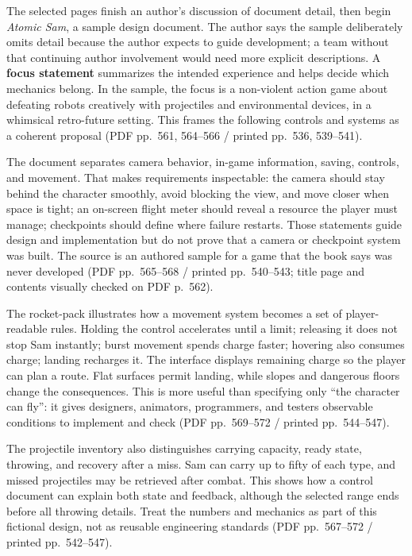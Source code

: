 The selected pages finish an author's discussion of document detail, then begin \emph{Atomic Sam}, a sample design document. The author says the sample deliberately omits detail because the author expects to guide development; a team without that continuing author involvement would need more explicit descriptions. A \textbf{focus statement} summarizes the intended experience and helps decide which mechanics belong. In the sample, the focus is a non-violent action game about defeating robots creatively with projectiles and environmental devices, in a whimsical retro-future setting. This frames the following controls and systems as a coherent proposal (PDF pp.~561, 564--566 / printed pp.~536, 539--541).

The document separates camera behavior, in-game information, saving, controls, and movement. That makes requirements inspectable: the camera should stay behind the character smoothly, avoid blocking the view, and move closer when space is tight; an on-screen flight meter should reveal a resource the player must manage; checkpoints should define where failure restarts. Those statements guide design and implementation but do not prove that a camera or checkpoint system was built. The source is an authored sample for a game that the book says was never developed (PDF pp.~565--568 / printed pp.~540--543; title page and contents visually checked on PDF p.~562).

The rocket-pack illustrates how a movement system becomes a set of player-readable rules. Holding the control accelerates until a limit; releasing it does not stop Sam instantly; burst movement spends charge faster; hovering also consumes charge; landing recharges it. The interface displays remaining charge so the player can plan a route. Flat surfaces permit landing, while slopes and dangerous floors change the consequences. This is more useful than specifying only ``the character can fly'': it gives designers, animators, programmers, and testers observable conditions to implement and check (PDF pp.~569--572 / printed pp.~544--547).

The projectile inventory also distinguishes carrying capacity, ready state, throwing, and recovery after a miss. Sam can carry up to fifty of each type, and missed projectiles may be retrieved after combat. This shows how a control document can explain both state and feedback, although the selected range ends before all throwing details. Treat the numbers and mechanics as part of this fictional design, not as reusable engineering standards (PDF pp.~567--572 / printed pp.~542--547).

